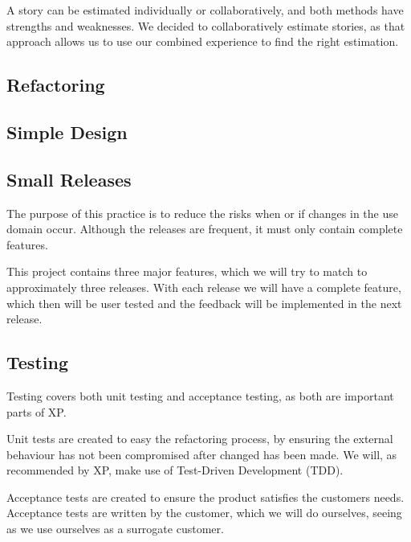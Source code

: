 A story can be estimated individually or collaboratively, and both methods have strengths and weaknesses.
We decided to collaboratively estimate stories, as that approach allows us to use our combined experience to find the right estimation.

\subsection{Refactoring}

\subsection{Simple Design}

\subsection{Small Releases}
The purpose of this practice is to reduce the risks when or if changes in the use domain occur.
Although the releases are frequent, it must only contain complete features.

This project contains three major features, which we will try to match to approximately three releases.
With each release we will have a complete feature, which then will be user tested and the feedback will be implemented in the next release.

\subsection{Testing}
Testing covers both unit testing and acceptance testing, as both are important parts of XP.

Unit tests are created to easy the refactoring process, by ensuring the external behaviour has not been compromised after changed has been made.
We will, as recommended by XP, make use of Test-Driven Development (TDD).

Acceptance tests are created to ensure the product satisfies the customers needs.
Acceptance tests are written by the customer, which we will do ourselves, seeing as we use ourselves as a surrogate customer.

